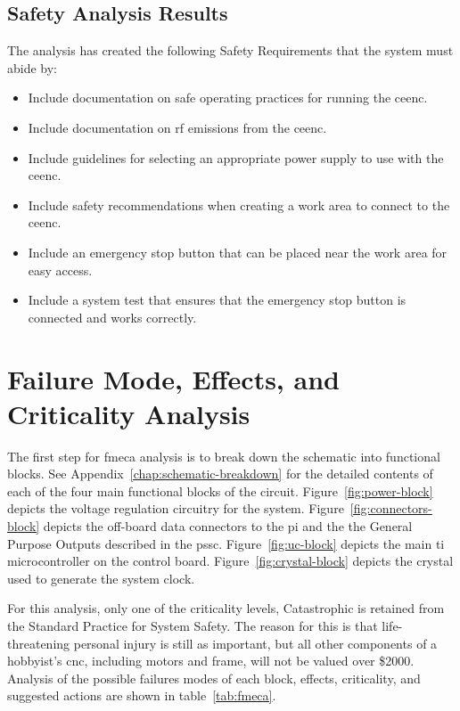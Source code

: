 \subsection{Safety Analysis Results}
The analysis has created the following Safety Requirements that the system must abide by:
\begin{itemize}
	\item Include documentation on safe operating practices for running the \gls{ceenc}.
	\item Include documentation on \gls{rf} emissions from the \gls{ceenc}.
	\item Include guidelines for selecting an appropriate power supply to use with the \gls{ceenc}.
	\item Include safety recommendations when creating a work area to connect to the \gls{ceenc}.
	\item Include an emergency stop button that can be placed near the work area for easy access.
	\item Include a system test that ensures that the emergency stop button is connected and works correctly.
\end{itemize}

\section{Failure Mode, Effects, and Criticality Analysis}
The first step for \gls{fmeca} analysis is to break down the schematic into functional blocks. 
See Appendix~\ref{chap:schematic-breakdown} for the detailed contents of each of the four main functional blocks of the circuit.
Figure~\ref{fig:power-block} depicts the voltage regulation circuitry for the system.
Figure~\ref{fig:connectors-block} depicts the off-board data connectors to the \gls{pi} and the the General Purpose Outputs described in the \gls{pssc}.
Figure~\ref{fig:uc-block} depicts the main \gls{ti} microcontroller on the control board.
Figure~\ref{fig:crystal-block} depicts the crystal used to generate the system clock.

For this analysis, only one of the criticality levels, Catastrophic is retained from the Standard Practice for System Safety\cite{mil882d}.
The reason for this is that life-threatening personal injury is still as important, but all other components of a hobbyist's \gls{cnc}, including motors and frame, will not be valued over \$2000.
Analysis of the possible failures modes of each block, effects, criticality, and suggested actions are shown in table~\ref{tab:fmeca}.

